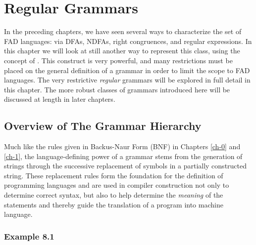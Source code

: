 \chapter{Regular Grammars}\label{ch-8}

In the preceding chapters, we have seen several ways to characterize the set
of FAD languages: via DFAs, NDFAs, right congruences, and regular expressions.
In this chapter we will look at still another way to represent this class, using
the concept of \emph{}. This construct is very powerful, and
many restrictions must be placed on the general definition of a grammar in order
to limit the scope to FAD languages. The very restrictive \emph{regular}
grammars will be explored in full detail in this chapter. The more robust
classes of grammars introduced here will be discussed at length in later
chapters.

\section{Overview of The Grammar Hierarchy}\label{sec-8.1}

Much like the rules given in Backus-Naur Form (BNF) in Chapters \ref{ch-0} and \ref{ch-1}, the
language-defining power of a grammar stems from the generation of strings
through the successive replacement of symbols in a partially constructed string.
These replacement rules form the foundation for the definition of programming
languages and are used in compiler construction not only to determine correct
syntax, but also to help determine the \emph{meaning} of the statements and
thereby guide the translation of a program into machine language.

\subsection*{Example 8.1}

